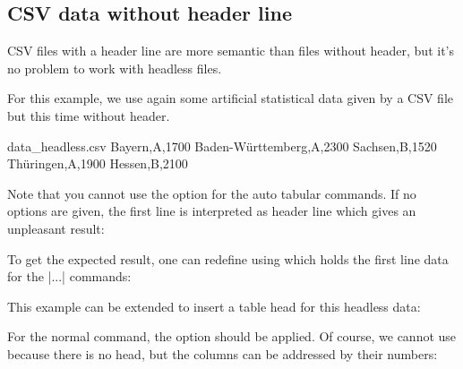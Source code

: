 \documentclass[a4paper,11pt]{ltxdoc}
\begin{document}
\clearpage
\subsection{CSV data without header line}\label{noheader}%
CSV files with a header line are more semantic than files without header,
but it's no problem to work with headless files.

For this example, we use again some artificial statistical data given by a CSV file
but this time without header.

\begin{tcbverbatimwrite}{data_headless.csv}
Bayern,A,1700
Baden-Württemberg,A,2300
Sachsen,B,1520
Thüringen,A,1900
Hessen,B,2100
\end{tcbverbatimwrite}


Note that you cannot use the  option for the auto tabular
commands. If no options are given, the first line is interpreted as header line
which gives an unpleasant result:

\begin{dispExample}
\end{dispExample}

To get the expected result, one can redefine 
using  which holds the first line data for the
|\csvauto...| commands:

\begin{dispExample}
\end{dispExample}

This example can be extended to insert a table head for this headless data:

\begin{dispExample}
\end{dispExample}

\clearpage

For the normal  command, the  option
should be applied. Of course, we cannot use 
because there is no head, but the columns can be addressed by their numbers:
\end{document}
